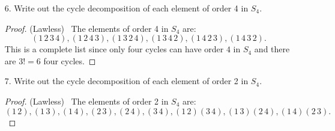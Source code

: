 \documentclass[10pt]{article}
\begin{document}
\begin{itemize}
\item[6.] Write out the cycle decomposition of each element of order 4 in $S_4$.

\begin{proof}(Lawless) \ The elements of order 4 in $S_4$ are: $$(1\,2\, 3\, 4), (1\, 2\, 4\, 3), (1\, 3\, 2\, 4), (1\, 3\, 4\, 2), (1\, 4\, 2\, 3), (1\, 4\, 3\, 2).$$
This is a complete list since only four cycles can have order $4$ in $S_4$ and
there are $3! = 6$ four cycles.
\end{proof}




\item[7.] Write out the cycle decomposition of each element of order 2 in $S_4$.

\begin{proof}(Lawless) \ The elements of order 2 in $S_4$ are:
$$(1\, 2), (1\,3), (1\,4), (2\,3), (2\,4), (3\,4), (1\,2)(3\,4), (1\,3)(2\,4), (1\,4)(2\,3).$$
\end{proof}
\end{itemize}
\end{document}
